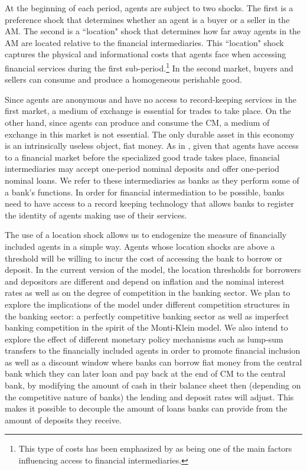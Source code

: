 \documentclass[12pt,a4paper,titlepage]{article}
\begin{document}
At the beginning of each period, agents are subject to two shocks. The first is a preference shock that determines whether an agent is a buyer or a seller in the AM. The second is a ``location" shock that determines how far away agents in the AM are located relative to the financial intermediaries. This ``location" shock  captures the physical and informational costs that agents face when accessing financial services during the first sub-period.\footnote{This type of costs has been emphasized by \cite{Allen2016} as being one of the main factors influencing access to  financial intermediaries.} In the second market, buyers and sellers can consume and produce a homogeneous perishable good.

Since agents are anonymous and have no access to record-keeping services in the first market, a medium of exchange is essential for trades to take place. On the other hand, since agents can produce and consume the CM, a medium of exchange in this market is not essential. The only durable asset in this economy is an intrinsically useless object, fiat money. As in \cite{Berentsen2007}, given that agents have access to a financial market before the specialized good trade takes place, financial intermediaries may accept one-period nominal deposits and offer one-period nominal loans. We refer to these intermediaries as banks as they perform some of a bank's functions. In order for financial intermediation to be possible, banks need to have access to a record keeping technology that allows banks to register the identity of agents making use of their services.

The use of a location shock allows us to endogenize the measure of financially included agents in a simple way. Agents whose location shocks are above a threshold will be willing to incur the cost of accessing the bank to borrow or deposit. In the current version of the model, the location thresholds for borrowers and depositors are different and depend on inflation and the nominal interest rates as well as on the degree of competition in the banking sector. We plan to explore the implications of the model under different competition structures in the banking sector: a perfectly competitive banking sector as well as imperfect banking competition in the spirit of the Monti-Klein model. We also intend to explore the effect of different monetary policy mechanisms such as lump-sum transfers to the financially included agents in order to promote financial inclusion as well as a discount window where banks can borrow fiat money from the central bank which they can later loan and pay back at the end of CM to the central bank, by modifying the amount of cash in their balance sheet then (depending on the competitive nature of banks) the lending and deposit rates will adjust. This makes it possible to decouple the amount of loans banks can provide from the amount of deposits they receive.
\end{document}
